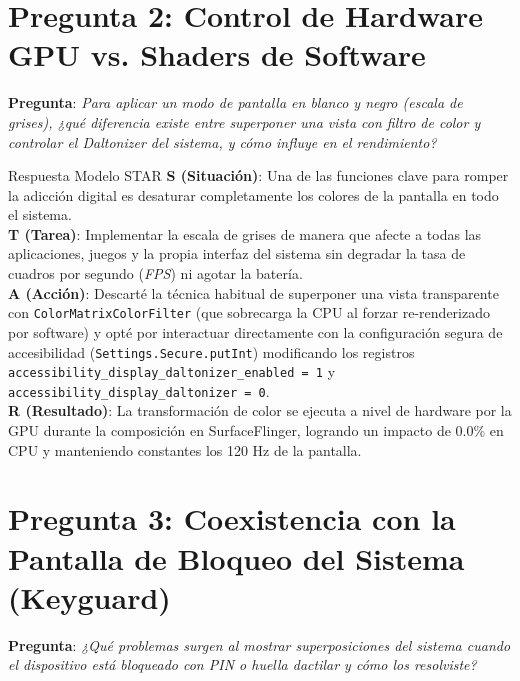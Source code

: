 \documentclass[11pt,a4paper,oneside]{report}
\begin{document}
\section{Pregunta 2: Control de Hardware GPU vs. Shaders de Software}
\textbf{Pregunta}: \textit{Para aplicar un modo de pantalla en blanco y negro (escala de grises), ¿qué diferencia existe entre superponer una vista con filtro de color y controlar el Daltonizer del sistema, y cómo influye en el rendimiento?}

\begin{starbox}{Respuesta Modelo STAR}
\textbf{\color{starSituation}S (Situación)}: Una de las funciones clave para romper la adicción digital es desaturar completamente los colores de la pantalla en todo el sistema.\\[0.15cm]
\textbf{\color{starTask}T (Tarea)}: Implementar la escala de grises de manera que afecte a todas las aplicaciones, juegos y la propia interfaz del sistema sin degradar la tasa de cuadros por segundo (\textit{FPS}) ni agotar la batería.\\[0.15cm]
\textbf{\color{starAction}A (Acción)}: Descarté la técnica habitual de superponer una vista transparente con \texttt{ColorMatrixColorFilter} (que sobrecarga la CPU al forzar re-renderizado por software) y opté por interactuar directamente con la configuración segura de accesibilidad (\texttt{Settings.Secure.putInt}) modificando los registros \texttt{accessibility\_display\_daltonizer\_enabled = 1} y \texttt{accessibility\_display\_daltonizer = 0}.\\[0.15cm]
\textbf{\color{starResult}R (Resultado)}: La transformación de color se ejecuta a nivel de hardware por la GPU durante la composición en SurfaceFlinger, logrando un impacto de 0.0\% en CPU y manteniendo constantes los 120 Hz de la pantalla.
\end{starbox}

\section{Pregunta 3: Coexistencia con la Pantalla de Bloqueo del Sistema (Keyguard)}
\textbf{Pregunta}: \textit{¿Qué problemas surgen al mostrar superposiciones del sistema cuando el dispositivo está bloqueado con PIN o huella dactilar y cómo los resolviste?}
\end{document}
